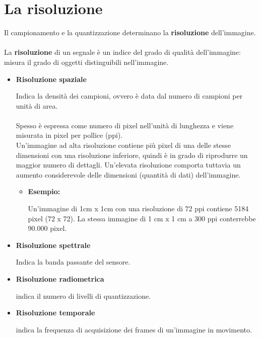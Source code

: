\section{La risoluzione}
Il campionamento e la quantizzazione determinano la \textbf{risoluzione}
dell’immagine. \\\\La \textbf{risoluzione} di un segnale è un indice del grado
di qualità dell’immagine: misura il grado di oggetti distinguibili
nell’immagine.
\begin{itemize}
    \item \textbf{Risoluzione spaziale}

          Indica la densità dei campioni, ovvero è data dal numero di campioni
          per unità di area. \\\\Spesso è espressa come numero di pixel
          nell’unità di lunghezza e viene misurata in pixel per pollice (ppi).
          \\Un’immagine ad alta risoluzione contiene più pixel di una delle
          stesse dimensioni con una risoluzione inferiore, quindi è in grado di
          riprodurre un maggior numero di dettagli. Un’elevata risoluzione
          comporta tuttavia un aumento considerevole delle dimensioni (quantità
          di dati) dell’immagine.
          \begin{itemize}
              \item \textbf{Esempio:}

                    Un’immagine di 1cm x 1cm con una risoluzione di 72 ppi
                    contiene 5184 pixel (72 x 72). La stessa immagine di 1 cm x
                    1 cm a 300 ppi conterrebbe 90.000 pixel.
          \end{itemize}
    \item \textbf{Risoluzione spettrale}

          Indica la banda passante del sensore.

    \item \textbf{Risoluzione radiometrica}

          indica il numero di livelli di quantizzazione.

    \item \textbf{Risoluzione temporale}

          indica la frequenza di acquisizione dei frames di un’immagine in
          movimento.
\end{itemize}
